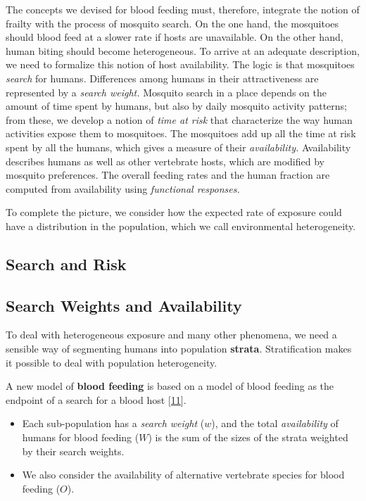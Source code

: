 \documentclass[
]{book}
\begin{document}
The concepts we devised for blood feeding must, therefore, integrate the notion of frailty with the process of mosquito search. On the one hand, the mosquitoes should blood feed at a slower rate if hosts are unavailable. On the other hand, human biting should become heterogeneous. To arrive at an adequate description, we need to formalize this notion of host availability.
The logic is that mosquitoes \emph{search} for humans. Differences among humans in their attractiveness are represented by a \emph{search weight.} Mosquito search in a place depends on the amount of time spent by humans, but also by daily mosquito activity patterns; from these, we develop a notion of \emph{time at risk} that characterize the way human activities expose them to mosquitoes. The mosquitoes add up all the time at risk spent by all the humans, which gives a measure of their \emph{availability.} Availability describes humans as well as other vertebrate hosts, which are modified by mosquito preferences. The overall feeding rates and the human fraction are computed from availability using \emph{functional responses.}

To complete the picture, we consider how the expected rate of exposure could have a distribution in the population, which we call environmental heterogeneity.

\hypertarget{search-and-risk}{%
\subsection{Search and Risk}\label{search-and-risk}}

\hypertarget{search-weights-and-availability}{%
\subsection{Search Weights and Availability}\label{search-weights-and-availability}}

To deal with heterogeneous exposure and many other phenomena, we need a sensible way of segmenting humans into population \textbf{strata}. Stratification makes it possible to deal with population heterogeneity.

A new model of \textbf{blood feeding} is based on a model of blood feeding as the endpoint of a search for a blood host {[}\protect\hyperlink{ref-WuSL2023SpatialDynamics}{11}{]}.

\begin{itemize}
\item
  Each sub-population has a \emph{search weight} (\(w\)), and the total \emph{availability} of humans for blood feeding (\(W\)) is the sum of the sizes of the strata weighted by their search weights.
\item
  We also consider the availability of alternative vertebrate species for blood feeding (\(O\)).
\end{itemize}
\end{document}
